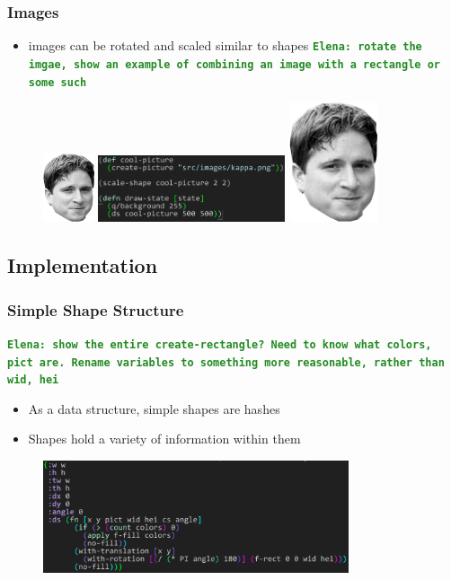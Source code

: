 \documentclass{beamer}
\newcommand{\comment}[1]{{\bf \tt  {#1}}}
\newcommand{\emcomment}[1]{\textcolor{ForestGreen}{\comment{Elena: {#1}}}}
\begin{document}
\begin{frame}
\frametitle{Images}
	\begin{itemize}
		\item images can be rotated and scaled similar to shapes \emcomment{rotate the imgae, show an example of combining an image with a rectangle or some such}
	\end{itemize}
	\begin{figure}
		\vspace{-0.3cm}
		\includegraphics[width=1.5cm]{PresentationImages/kappa96x130.png}
		\hspace{0.4cm}
		\includegraphics[width=5.5cm]{PresentationImages/pictureCode.png}
		\hspace{0.4cm}
		\includegraphics[width=2.6cm]{PresentationImages/kappa96x130.png}
	\end{figure}

\end{frame}


\subsection{Implementation}

\begin{frame}
\frametitle{Simple Shape Structure}
\emcomment{show the entire create-rectangle? Need to know what colors, pict are. Rename variables to something more reasonable, rather than wid, hei}
	\begin{itemize}
		\item As a data structure, simple shapes are hashes
		\item Shapes hold a variety of information within them
	\end{itemize}
	\begin{figure}
		\includegraphics[width=9cm]{PresentationImages/rectHashmap.png}
	\end{figure}
\end{frame}
\end{document}
